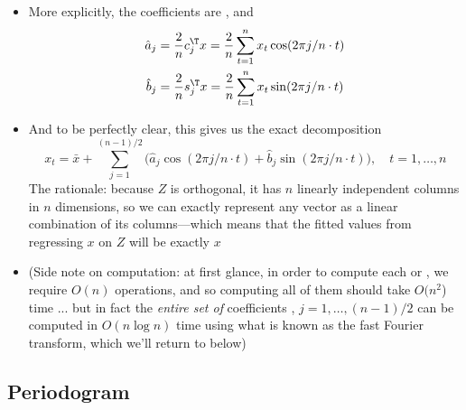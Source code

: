 \documentclass{article}
\begin{document}
\begin{itemize}
\item More explicitly, the coefficients are , and   
  \begin{equation}
  \label{eq:fourier_coef}
  \begin{aligned}
  \hat{a}_j &= \frac{2}{n} c_j^\T x = \frac{2}{n} \sum_{t=1}^n x_t \cos(2\pi j/n
  \cdot t) \\
  \hat{b}_j &= \frac{2}{n} s_j^\T x = \frac{2}{n} \sum_{t=1}^n x_t \sin(2\pi j/n
  \cdot t) 
  \end{aligned}
  \end{equation}

\item And to be perfectly clear, this gives us the exact decomposition 
  \begin{equation}
  \label{eq:fourier_decomp}
  x_t = \bar{x} + \sum_{j=1}^{(n-1)/2} \Big( \hat{a}_j \cos(2\pi j/n \cdot t) + 
  \hat{b}_j \sin(2\pi j/n \cdot t) \Big), \quad t = 1,\dots,n 
  \end{equation}
  The rationale: because $Z$ is orthogonal, it has $n$ linearly independent 
  columns in $n$ dimensions, so we can exactly represent any vector as a linear
  combination of its columns---which means that the fitted values from
  regressing $x$ on $Z$ will be exactly $x$  

\item (Side note on computation: at first glance, in order to compute each
   or , we require $O(n)$ operations, and 
  so computing all of them should take $O(n^2$) time ... but in fact the
  \emph{entire set of} coefficients , $j =
  1,\dots,(n-1)/2$ can be computed in $O(n \log{n})$ time using what is known as
  the fast Fourier transform, which we'll return to below)
\end{itemize}

\subsection{Periodogram}
\end{document}
